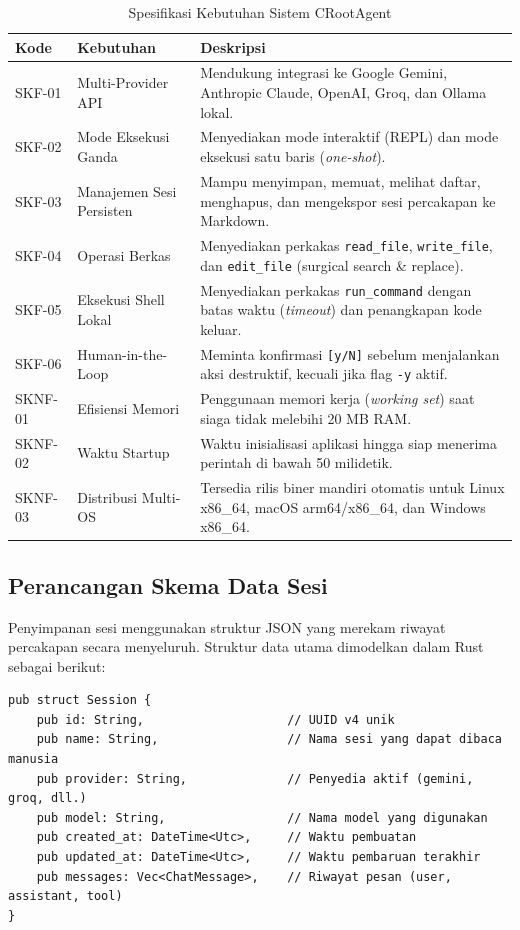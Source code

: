 \begin{table}[htbp]
\centering
\small
\caption{Spesifikasi Kebutuhan Sistem CRootAgent}
\label{tab:requirements}
\begin{tabularx}{\textwidth}{l p{3.2cm} X}
\toprule
\textbf{Kode} & \textbf{Kebutuhan} & \textbf{Deskripsi} \\
\midrule
SKF-01 & Multi-Provider API & Mendukung integrasi ke Google Gemini, Anthropic Claude, OpenAI, Groq, dan Ollama lokal. \\
SKF-02 & Mode Eksekusi Ganda & Menyediakan mode interaktif (REPL) dan mode eksekusi satu baris (\textit{one-shot}). \\
SKF-03 & Manajemen Sesi Persisten & Mampu menyimpan, memuat, melihat daftar, menghapus, dan mengekspor sesi percakapan ke Markdown. \\
SKF-04 & Operasi Berkas & Menyediakan perkakas \texttt{read\_file}, \texttt{write\_file}, dan \texttt{edit\_file} (surgical search \& replace). \\
SKF-05 & Eksekusi Shell Lokal & Menyediakan perkakas \texttt{run\_command} dengan batas waktu (\textit{timeout}) dan penangkapan kode keluar. \\
SKF-06 & Human-in-the-Loop & Meminta konfirmasi \texttt{[y/N]} sebelum menjalankan aksi destruktif, kecuali jika flag \texttt{-y} aktif. \\
SKNF-01 & Efisiensi Memori & Penggunaan memori kerja (\textit{working set}) saat siaga tidak melebihi 20 MB RAM. \\
SKNF-02 & Waktu Startup & Waktu inisialisasi aplikasi hingga siap menerima perintah di bawah 50 milidetik. \\
SKNF-03 & Distribusi Multi-OS & Tersedia rilis biner mandiri otomatis untuk Linux x86\_64, macOS arm64/x86\_64, dan Windows x86\_64. \\
\bottomrule
\end{tabularx}
\end{table}

\subsection{Perancangan Skema Data Sesi}
Penyimpanan sesi menggunakan struktur JSON yang merekam riwayat percakapan secara menyeluruh. Struktur data utama dimodelkan dalam Rust sebagai berikut:

\begin{verbatim}
pub struct Session {
    pub id: String,                    // UUID v4 unik
    pub name: String,                  // Nama sesi yang dapat dibaca manusia
    pub provider: String,              // Penyedia aktif (gemini, groq, dll.)
    pub model: String,                 // Nama model yang digunakan
    pub created_at: DateTime<Utc>,     // Waktu pembuatan
    pub updated_at: DateTime<Utc>,     // Waktu pembaruan terakhir
    pub messages: Vec<ChatMessage>,    // Riwayat pesan (user, assistant, tool)
}
\end{verbatim}

